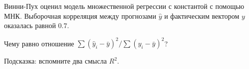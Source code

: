 
\begin{question}
Винни-Пух оценил модель множественной регрессии с константой с помощью МНК.
Выборочная корреляция между прогнозами \(\hat y\) и фактическим вектором \(y\) оказалась равной \(0.7\).

Чему равно отношение \(\sum (\hat y_i - \bar y)^2 /\sum (y_i - \bar y)^2\)?
\end{question}

\begin{solution}
Подсказка: вспомните два смысла \(R^2\).
\end{solution}

